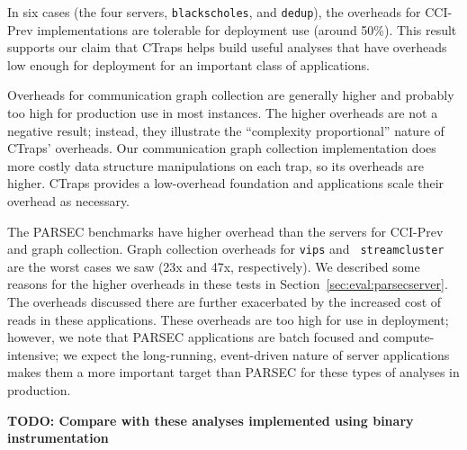 \documentclass[preprint,9pt]{sigplanconf}
\newcommand{\addtodo}[1]{\textcolor{red}{[To do: #1]}}
\newcommand{\ctraps}{CTraps\xspace}
\newcommand{\ctrapsmm}{CTraps-NRR\xspace}
\begin{document}
In six cases (the four servers, {\tt blackscholes}, and {\tt dedup}), the overheads
for CCI-Prev implementations are tolerable for deployment use (around 50\%).
This result supports our claim that \ctraps helps build useful analyses that
have overheads low enough for deployment for an important class of
applications.  

Overheads for communication graph collection are generally higher and probably
too high for production use in most instances.  The higher overheads are not a
negative result; instead, they illustrate the ``complexity proportional''
nature of \ctraps' overheads.  Our communication graph collection
implementation does more costly data structure manipulations on each trap, so
its overheads are higher.  \ctraps provides a low-overhead foundation and
applications scale their overhead as necessary. 



The PARSEC benchmarks have higher overhead than the servers for CCI-Prev and
graph collection.  Graph collection overheads for {\tt vips} and {\tt
streamcluster} are the worst cases we saw (23x and 47x, respectively).  We
described some reasons for the higher overheads in these tests in
Section~\ref{sec:eval:parsecserver}.  The overheads discussed there are further
exacerbated by the increased cost of reads in these applications.  These
overheads are too high for use in deployment;  however, we note that PARSEC
applications are batch focused and compute-intensive; we expect the
long-running, event-driven nature of server applications makes them a more
important target than PARSEC for these types of analyses in production.  

{\bf TODO: Compare with these analyses implemented using binary instrumentation}



\end{document}
